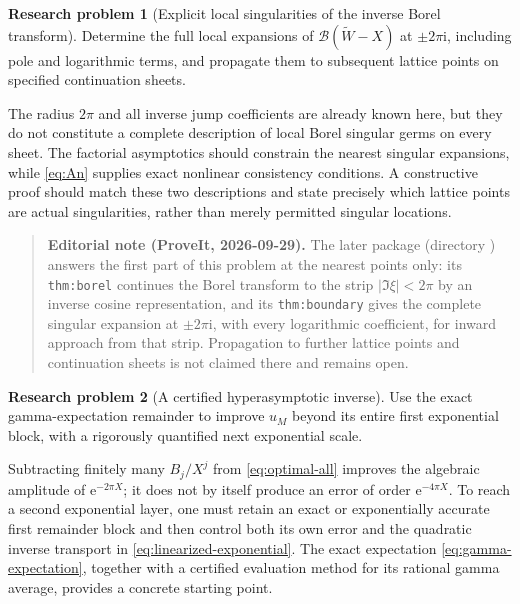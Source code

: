 \documentclass[11pt,a4paper]{article}
\theoremstyle{definition}
\newtheorem{problem}{Research problem}
\numberwithin{equation}{section}
\newcommand{\ii}{\mathrm{i}}
\newcommand{\ee}{\mathrm{e}}
\newcommand{\Borel}{\mathcal B}
\begin{document}
\begin{problem}[Explicit local singularities of the inverse Borel transform]
Determine the full local expansions of $\Borel(\widetilde W-X)$ at $\pm2\pi\ii$, including pole and logarithmic terms, and propagate them to subsequent lattice points on specified continuation sheets.
\end{problem}
The radius $2\pi$ and all inverse jump coefficients are already known here, but they do not constitute a complete description of local Borel singular germs on every sheet. The factorial asymptotics should constrain the nearest singular expansions, while \eqref{eq:An} supplies exact nonlinear consistency conditions. A constructive proof should match these two descriptions and state precisely which lattice points are actual singularities, rather than merely permitted singular locations.

\begin{quote}\small\textbf{Editorial note (ProveIt, 2026-09-29).} The later package  (directory ) answers the first part of this problem at the nearest points only: its \texttt{thm:borel} continues the Borel transform to the strip $|\Im\xi|<2\pi$ by an inverse cosine representation, and its \texttt{thm:boundary} gives the complete singular expansion at $\pm2\pi\ii$, with every logarithmic coefficient, for inward approach from that strip. Propagation to further lattice points and continuation sheets is not claimed there and remains open.\end{quote}

\begin{problem}[A certified hyperasymptotic inverse]
Use the exact gamma-expectation remainder to improve $u_M$ beyond its entire first exponential block, with a rigorously quantified next exponential scale.
\end{problem}
Subtracting finitely many $B_j/X^j$ from \eqref{eq:optimal-all} improves the algebraic amplitude of $\ee^{-2\pi X}$; it does not by itself produce an error of order $\ee^{-4\pi X}$. To reach a second exponential layer, one must retain an exact or exponentially accurate first remainder block and then control both its own error and the quadratic inverse transport in \eqref{eq:linearized-exponential}. The exact expectation \eqref{eq:gamma-expectation}, together with a certified evaluation method for its rational gamma average, provides a concrete starting point.
\end{document}
